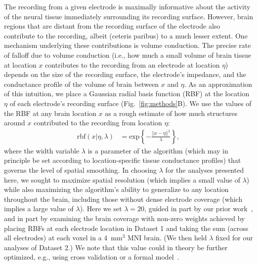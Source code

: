 \documentclass[11pt]{article}
\providecommand{\DIFaddtex}[1]{{\protect\color{blue}\uwave{#1}}} %
\providecommand{\DIFaddbegin}{} %
\providecommand{\DIFaddend}{} %
\providecommand{\DIFadd}[1]{\texorpdfstring{\DIFaddtex{#1}}{#1}} %
\newcommand{\DIFaddincludegraphics}[2][]{{\color{blue}\fbox{\DIFOincludegraphics[#1]{#2}}}} %
\DeclareRobustCommand{\DIFaddbegin}{\DIFOaddbegin \let\includegraphics\DIFaddincludegraphics} %
\DeclareRobustCommand{\DIFaddend}{\DIFOaddend \let\includegraphics\DIFOincludegraphics} %
\begin{document}
The recording from a given electrode is maximally informative about the activity
of the neural tissue immediately surrounding its recording surface.  However,
brain regions that are distant from the recording surface of the electrode also
contribute to the recording, albeit (ceteris paribus) to a much lesser extent.
One mechanism underlying these contributions is volume conduction.  The precise
rate of falloff due to volume conduction (i.e., how much a small volume of brain
tissue at location $x$ contributes to the recording from an electrode at
location $\eta$) depends on the size of the recording surface, the electrode's
impedance, and the conductance profile of the volume of brain between $x$ and
$\eta$.  As an approximation of this intuition, we place a Gaussian radial basis
function (RBF) at the location $\eta$ of each electrode's recording surface
(Fig.~\ref{fig:methods}B).  We use the values of the RBF at any brain location
$x$ as a rough estimate of how much structures around $x$ contributed to the
recording from location $\eta$: \begin{align} \mathrm{rbf}(x|\eta,\lambda) & =
\mathrm{exp}\left\{ -\frac{||x - \eta||^2}{\lambda} \right\},\label{eqn:rbf}
\end{align} where the width variable $\lambda$ is a parameter of the algorithm
(which may in principle be set according to location-specific tissue conductance
profiles) that governs the level of spatial smoothing.  In choosing $\lambda$
for the analyses presented here, we sought to maximize spatial resolution (which
implies a small value of $\lambda$) while also maximizing the algorithm's
ability to generalize to any location throughout the brain, including those
without dense electrode coverage (which implies a large value of $\lambda$).
Here we set $\lambda = 20$, guided in part by our prior \DIFaddbegin \DIFadd{related
}\DIFaddend work~\citep{MannEtal14b, MannEtal18}, and in part by examining the brain
coverage with non-zero weights achieved by placing RBFs at each electrode
location in Dataset 1 and taking the sum (across all electrodes) at each voxel
in a 4~mm$^3$ MNI brain.  (We then held $\lambda$ fixed for our analyses of
Dataset 2.)  We note that this value could in theory be further optimized, e.g.,
using cross validation or a formal model~\citep[e.g.,][]{MannEtal18}.
\end{document}
